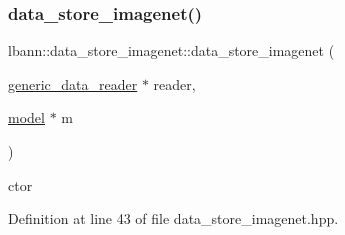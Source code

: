 \subsubsection{\texorpdfstring{data\+\_\+store\+\_\+imagenet()}{data\_store\_imagenet()}\hspace{0.1cm}{\footnotesize\ttfamily [1/2]}}
{\footnotesize\ttfamily lbann\+::data\+\_\+store\+\_\+imagenet\+::data\+\_\+store\+\_\+imagenet (\begin{DoxyParamCaption}\item[{\hyperlink{classlbann_1_1generic__data__reader}{generic\+\_\+data\+\_\+reader} $\ast$}]{reader,  }\item[{\hyperlink{classlbann_1_1model}{model} $\ast$}]{m }\end{DoxyParamCaption})\hspace{0.3cm}{\ttfamily [inline]}}



ctor 



Definition at line 43 of file data\+\_\+store\+\_\+imagenet.\+hpp.


